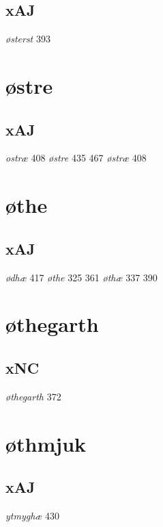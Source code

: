 \documentclass[a4paper,twocolumn]{article}
\begin{document}
\subsection{xAJ}
\label{sec:org36a56ed}
\emph{østerst} 393 
\section{østre}
\label{sec:orgd743a76}
\subsection{xAJ}
\label{sec:org52fce9e}
\emph{ostræ} 408 \emph{østre} 435 467 \emph{østræ} 408 
\section{øthe}
\label{sec:org3ba6bef}
\subsection{xAJ}
\label{sec:org0602550}
\emph{ødhæ} 417 \emph{øthe} 325 361 \emph{øthæ} 337 390 
\section{øthegarth}
\label{sec:orgb5e1dad}
\subsection{xNC}
\label{sec:orge2c3ab6}
\emph{øthegarth} 372 
\section{øthmjuk}
\label{sec:org02264ce}
\subsection{xAJ}
\label{sec:org746a32d}
\emph{ytmyghæ} 430 
\end{document}
